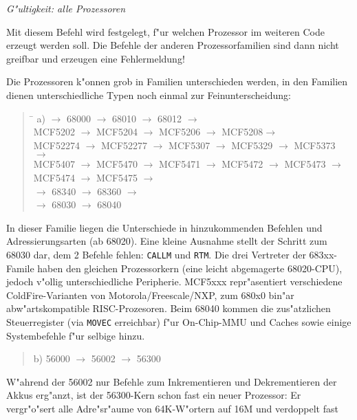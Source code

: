 \documentclass[12pt,a4paper,twoside]{report}
\newcommand{\tty}[1]{{\tt #1}}
\begin{document}
{\em G"ultigkeit: alle Prozessoren}

Mit diesem Befehl wird festgelegt, f"ur welchen Prozessor im weiteren
Code erzeugt werden soll.  Die Befehle der anderen Prozessorfamilien
sind dann nicht greifbar und erzeugen eine Fehlermeldung!
\par
Die Prozessoren k"onnen grob in Familien unterschieden werden, in den
Familien dienen unterschiedliche Typen noch einmal zur Feinunterscheidung:
\begin{quote}
\begin{tabbing}
\hspace{0.7cm} \= \kill
a)  $\rightarrow$ 68000 $\rightarrow$ 68010 $\rightarrow$ 68012 $\rightarrow$ \\
   \> MCF5202 $\rightarrow$ MCF5204 $\rightarrow$ MCF5206 $\rightarrow$ MCF5208$\rightarrow$ \\
   \> MCF52274 $\rightarrow$ MCF52277 $\rightarrow$ MCF5307 $\rightarrow$ MCF5329 $\rightarrow$ MCF5373 $\rightarrow$ \\
   \> MCF5407 $\rightarrow$ MCF5470 $\rightarrow$ MCF5471 $\rightarrow$ MCF5472 $\rightarrow$ MCF5473 $\rightarrow$ \\
   \> MCF5474 $\rightarrow$ MCF5475 $\rightarrow$ \\
    $\rightarrow$ 68340 $\rightarrow$ 68360 $\rightarrow$ \\
    $\rightarrow$ 68030 $\rightarrow$ 68040
\end{tabbing}
\end{quote}
In dieser Familie liegen die Unterschiede in hinzukommenden Befehlen
und Adressierungsarten (ab 68020).  Eine kleine Ausnahme stellt der
Schritt zum 68030 dar, dem 2 Befehle fehlen: \tty{CALLM} und \tty{RTM}.
Die drei Vertreter der 683xx-Famile haben den gleichen Prozessorkern (eine
leicht abgemagerte 68020-CPU), jedoch v"ollig unterschiedliche Peripherie.
MCF5xxx repr"asentiert verschiedene ColdFire-Varianten von Motorola/Freescale/NXP,
zum 680x0 bin"ar abw"artskompatible RISC-Prozesoren. Beim 68040 kommen die zus"atzlichen
Steuerregister (via \tty{MOVEC} erreichbar) f"ur On-Chip-MMU und Caches
sowie einige Systembefehle f"ur selbige hinzu.
\begin{quote}
b) 56000 $\longrightarrow$ 56002 $\longrightarrow$ 56300
\end{quote}
W"ahrend der 56002 nur Befehle zum Inkrementieren und Dekrementieren der
Akkus erg"anzt, ist der 56300-Kern schon fast ein neuer Prozessor: Er
vergr"o"sert alle Adre"sr"aume von 64K-W"ortern auf 16M und verdoppelt fast
\end{document}
